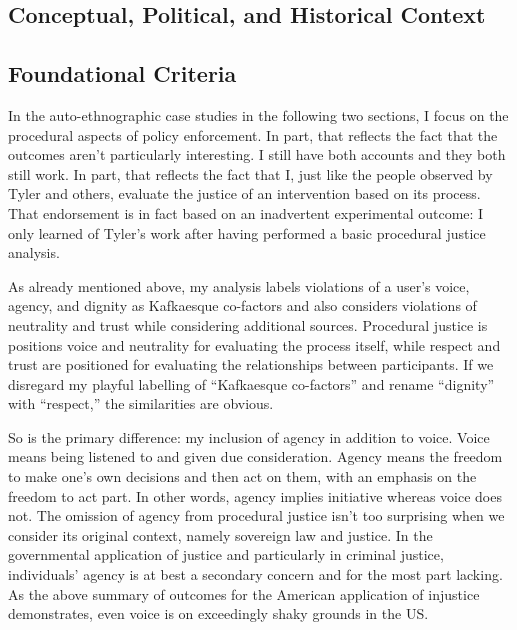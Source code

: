 \subsection{Conceptual, Political, and Historical Context}
\label{sec:context}




\subsection{Foundational Criteria}
\label{sec:criteria}

In the auto-ethnographic case studies in the following two sections, I focus on
the procedural aspects of policy enforcement. In part, that reflects the fact
that the outcomes aren't particularly interesting. I still have both accounts
and they both still work. In part, that reflects the fact that I, just like the
people observed by Tyler and others, evaluate the justice of an intervention
based on its process. That endorsement is in fact based on an inadvertent
experimental outcome: I only learned of Tyler's work after having performed a
basic procedural justice analysis.

As already mentioned above, my analysis labels violations of a user's voice,
agency, and dignity as Kafkaesque co-factors and also considers violations of
neutrality and trust while considering additional sources. Procedural justice is
positions voice and neutrality for evaluating the process itself, while respect
and trust are positioned for evaluating the relationships between participants.
If we disregard my playful labelling of ``Kafkaesque co-factors'' and rename
``dignity'' with ``respect,'' the similarities are obvious.

So is the primary difference: my inclusion of agency in addition to voice. Voice
means being listened to and given due consideration. Agency means the freedom to
make one's own decisions and then act on them, with an emphasis on the freedom
to act part. In other words, agency implies initiative whereas voice does not.
The omission of agency from procedural justice isn't too surprising when we
consider its original context, namely sovereign law and justice. In the
governmental application of justice and particularly in criminal justice,
individuals' agency is at best a secondary concern and for the most part
lacking. As the above summary of outcomes for the American application of
injustice demonstrates, even voice is on exceedingly shaky grounds in the US.

